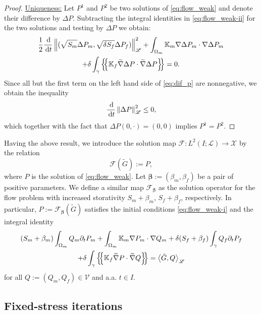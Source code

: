\documentclass[a4paper]{article}
\numberwithin{equation}{section}
\def\agrad{\widetilde\nabla}
\def\avg#1{\left\{\mskip-5mu\left\{#1\right\}\mskip-5mu\right\}}
\def\bbeta{\boldsymbol{\beta}}
\def\d {\,{\rm d}}
\def\ddt#1{\frac{\d #1}{\d t}}
\def\dt{\prtl_t}
\def\dual#1#2{\left\langle #1,#2\right\rangle}
\def\Hf{\mathscr{L}} %
\def\norm#1{\left\|#1\right\|}
\def\prtl{\partial}
\def\tn#1{{\mathbb{#1}}}    %
\def\Vf{{\mathcal V}} %
\newcommand{\eqs}[1]{\begin{equation*}#1\end{equation*}}
\newcommand{\ml}[1]{\begin{multline}#1\end{multline}}
\begin{document}
\begin{proof}
\underline{Uniqueness:}
Let $P^1$ and $P^2$ be two solutions of \eqref{eq:flow_weak} and denote their difference by $\Delta P$.
Subtracting the integral identities in \eqref{eq:flow_weak-ii} for the two solutions and testing by $\Delta P$ we obtain:
\ml{ \label{eq:dif_p} \frac12\ddt{}\norm{(\sqrt{S_m}\Delta P_m,\sqrt{\delta S_f}\Delta P_f)}_\Hf^2
+ \int_{\Omega_m}\tn K_m\nabla\Delta P_m\cdot\nabla\Delta P_m\\
+ \delta\int_\gamma\avg{\tn K_f\agrad\Delta P\cdot\agrad \Delta P} = 0. }
Since all but the first term on the left hand side of \eqref{eq:dif_p} are nonnegative, we obtain the inequality
\eqs{ \ddt{}\norm{\Delta P}_\Hf^2 \le 0, }
which together with the fact that $\Delta P(0,\cdot) = (0,0)$ implies $P^1=P^2$.
\end{proof}
% 
Having the above result, we introduce the solution map $\mathcal F:L^2( I;\Hf)\to \mathcal X$ by the relation
\eqs{ \mathcal F(\tilde G) := P, }
where $P$ is the solution of \eqref{eq:flow_weak}.
Let $\bbeta:=(\beta_m,\beta_f)$ be a pair of positive parameters.
We define a similar map $\mathcal F_{\bbeta}$ as the solution operator for the flow problem with increased storativity $S_m+\beta_m$, $S_f+\beta_f$, respectively.
In particular, $P:=\mathcal F_{\bbeta}(\tilde G)$ satisfies the initial conditions 
\eqref{eq:flow_weak-i} and the integral identity
\ml{ \label{eq:flow_problem_beta} (S_m+\beta_m)\int_{\Omega_m} Q_m\dt P_m + \int_{\Omega_m}\tn K_m\nabla P_m\cdot\nabla Q_m + \delta (S_f+\beta_f)\int_\gamma Q_f\dt P_f\\
+ \delta\int_\gamma\avg{\tn K_f\agrad P\cdot\agrad Q}
= \dual{\tilde G}{Q}_\Hf }
for all $Q:=(Q_m,Q_f)\in\Vf$ and a.a. $t\in I$.



\subsection{Fixed-stress iterations}\label{sec:iter}
\end{document}
